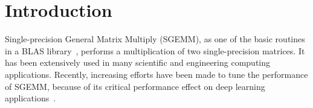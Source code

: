 
\section{Introduction}

Single-precision General Matrix Multiply (SGEMM), as one 
of the basic routines in a BLAS library~\cite{blas,intel2007intel,amd2014}, performs a multiplication of two single-precision matrices. 
It has been extensively used in many scientific and engineering 
computing applications. 
Recently, increasing efforts have been made to tune the performance of SGEMM, because of its critical performance effect on deep learning applications~\cite{chetlur2014cudnn,nervana_sgemm_wiki}.

